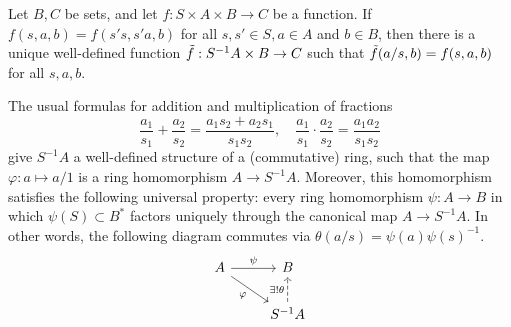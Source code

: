 \begin{corollary}
    Let $B, C$ be sets, and let $f: S \times A \times B \rightarrow C$ be a function. If $f(s,a,b) = f(s's, s'a, b)$ for all $s, s' \in S, a \in A$ and $b \in B$, then there is a unique well-defined function $\Tilde{f}: S^{-1}A\times B \rightarrow C$ such that $\Tilde{f}(a/s, b) = f(s,a, b)$ for all $s,a,b$.
\end{corollary}

\begin{proposition}
    The usual formulas for addition and multiplication of fractions
    \[\frac{a_1}{s_1} + \frac{a_2}{s_2} = \frac{a_1s_2+a_2s_1}{s_1s_2}, \quad \frac{a_1}{s_1} \cdot \frac{a_2}{s_2} = \frac{a_1a_2}{s_1s_2}\]
    give $S^{-1}A$ a well-defined structure of a (commutative) ring, such that the map $\varphi: a \mapsto a/1$ is a ring homomorphism $A \rightarrow S^{-1}A$. Moreover, this homomorphism satisfies the following universal property: every ring homomorphism $\psi: A \rightarrow B$ in which $\psi(S) \subset B^*$ factors uniquely through the canonical map $A \rightarrow S^{-1}A$. In other words, the following diagram commutes via $\theta(a/s) = \psi(a)\psi(s)^{-1}$.
    \[\begin{tikzcd}
A \arrow{r}{\psi} \arrow[swap]{dr}{\varphi} & B \\
&\arrow[dashed]{u}{\exists! \theta} S^{-1}A
\end{tikzcd}\]
\end{proposition}
